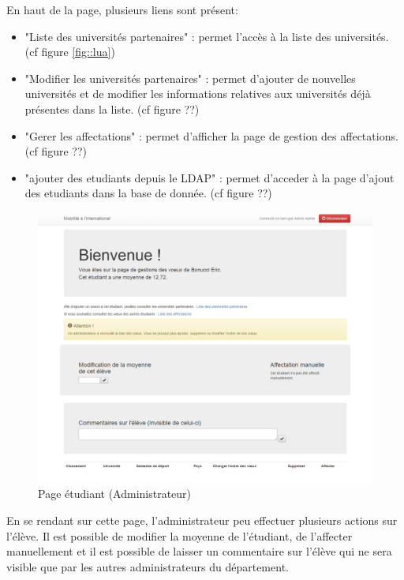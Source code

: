 En haut de la page, plusieurs liens sont présent:
\begin{itemize}
	\item "Liste des universités partenaires" : permet l'accès à la liste des universités. (cf figure \ref{fig::lua})
	\item "Modifier les universités partenaires" : permet d'ajouter de nouvelles universités et de modifier les informations relatives aux universités déjà présentes dans la liste. (cf figure ??)
	\item "Gerer les affectations" : permet d'afficher la page de gestion des affectations. (cf figure ??)
	\item "ajouter des etudiants depuis le LDAP" : permet d'acceder à la page d'ajout des etudiants dans la base de donnée. (cf figure ??)

\end{itemize} 

\bigbreak

\begin{figure}[H]
	\includegraphics[scale=0.35]{images/PEA.png}
	\caption{Page étudiant (Administrateur)}
	\label{fig::pea}
\end{figure}

En se rendant sur cette page, l'administrateur peu effectuer plusieurs actions sur l'élève. Il est possible de modifier la moyenne de l'étudiant, de l'affecter manuellement et il est possible de laisser un commentaire sur l'élève qui ne sera visible que par les autres administrateurs du département.


